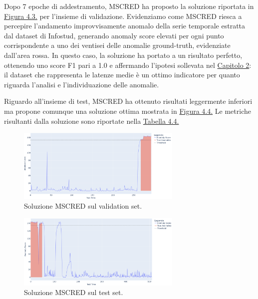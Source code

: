 \label{val-mscred}
Dopo 7 epoche di addestramento, MSCRED ha proposto la soluzione riportata in \hyperref[fig:sol-valid-mscred]{Figura 4.3.} per l'insieme 
di validazione. Evidenziamo come MSCRED riesca a percepire l'andamento improvvisamente anomalo della serie temporale estratta 
dal dataset di Infostud, 
generando anomaly score elevati per ogni punto corrispondente a uno dei ventisei delle anomalie ground-truth, 
evidenziate dall'area rossa. In questo caso, la soluzione ha portato a un risultato perfetto, ottenendo uno score 
F1 pari a 1.0 e affermando l'ipotesi sollevata nel \hyperref[cap2:hypothesis]{Capitolo 2}: il dataset che rappresenta 
le latenze medie è un ottimo indicatore per quanto riguarda l'analisi e l'individuazione delle anomalie.

Riguardo all'insieme di test, MSCRED ha ottenuto risultati leggermente inferiori ma propone comunque una soluzione ottima 
mostrata in \hyperref[fig:sol-test-mscred]{Figura 4.4.} Le metriche risultanti dalla soluzione sono riportate 
nella \hyperref[tab:mscred-metrics]{Tabella 4.4.}

\begin{figure}[H]
    \centering
    \includegraphics[width=0.7\textwidth]{./input/chapters/models/figs/sol-valid-mscred.png}
    \caption{Soluzione MSCRED sul validation set.}
    \label{fig:sol-valid-mscred}
\end{figure}


\begin{figure}[H]
    \centering
    \includegraphics[width=0.7\textwidth]{./input/chapters/models/figs/sol-test-mscred.png}
    \caption{Soluzione MSCRED sul test set.}
    \label{fig:sol-test-mscred}
\end{figure}

